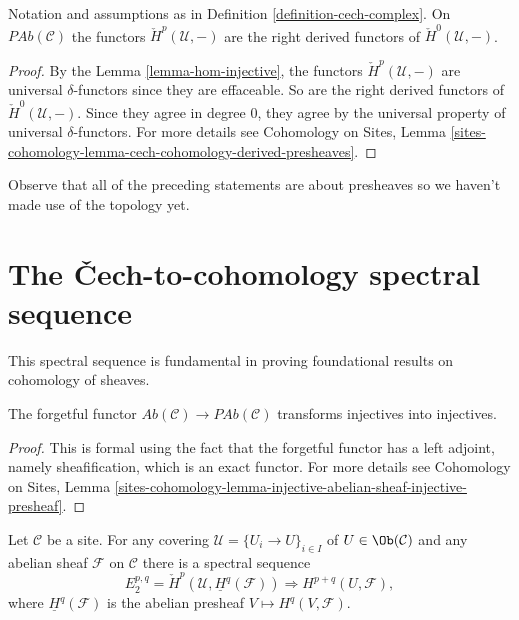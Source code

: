 \begin{theorem}
\label{theorem-cech-derived}
Notation and assumptions as in Definition \ref{definition-cech-complex}.
On $\textit{PAb}(\mathcal{C})$ the functors $\check{H}^p(\mathcal{U}, -)$ are
the right derived functors of $\check{H}^0(\mathcal{U}, -)$.
\end{theorem}

\begin{proof}
By the Lemma \ref{lemma-hom-injective}, the functors
$\check H^p(\mathcal{U}, -)$ are universal
$\delta$-functors since they are effaceable.
So are the right derived functors of $\check H^0(\mathcal{U}, -)$. Since they
agree in degree $0$, they agree by the universal property of universal
$\delta$-functors. For more details see
Cohomology on Sites,
Lemma \ref{sites-cohomology-lemma-cech-cohomology-derived-presheaves}.
\end{proof}

\begin{remark}
\label{remark-presheaves-no-topology}
Observe that all of the preceding statements are about presheaves so we haven't
made use of the topology yet.
\end{remark}




\section{The {\v C}ech-to-cohomology spectral sequence}
\label{section-cech-ss}

\noindent
This spectral sequence is fundamental in proving foundational results on
cohomology of sheaves.

\begin{lemma}
\label{lemma-forget-injectives}
The forgetful functor $\textit{Ab}(\mathcal{C})\to \textit{PAb}(\mathcal{C})$
transforms injectives into injectives.
\end{lemma}

\begin{proof}
This is formal using the fact that the forgetful functor has a left adjoint,
namely sheafification, which is an exact functor. For more details see
Cohomology on Sites,
Lemma \ref{sites-cohomology-lemma-injective-abelian-sheaf-injective-presheaf}.
\end{proof}

\begin{theorem}
\label{theorem-cech-ss}
Let $\mathcal{C}$ be a site. For any covering
$\mathcal{U} = \{U_i \to U\}_{i \in I}$ of $U \in \Ob(\mathcal{C})$
and any abelian sheaf $\mathcal{F}$ on $\mathcal{C}$
there is a spectral sequence
$$
E_2^{p, q}
=
\check H^p(\mathcal{U}, \underline{H}^q(\mathcal{F}))
\Rightarrow
H^{p+q}(U, \mathcal{F}),
$$
where $\underline{H}^q(\mathcal{F})$ is the abelian presheaf
$V \mapsto H^q(V, \mathcal{F})$.
\end{theorem}

